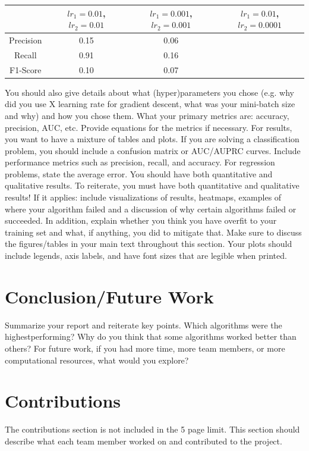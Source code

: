\documentclass{article}
\begin{document}
\begin{tabular}{|c|c|c|c|}
\hline
& $lr_{1}=0.01$, $lr_{2}=0.01$ & $lr_{1}=0.001$, $lr_{2}=0.001$  &   $lr_{1}=0.01$, $lr_{2}=0.0001$ \\
\hline
 Precision    & 0.15        & 0.06  & \\
 Recall       &  0.91       & 0.16  & \\
 F1-Score     & 0.10        & 0.07  & \\
 \hline
\end{tabular}

You should also give details about what (hyper)parameters you chose (e.g. why did you
use X learning rate for gradient descent, what was your mini-batch size and why) and how
you chose them. What your primary metrics are: accuracy, precision,
AUC, etc. Provide equations for the metrics if necessary. For results, you want to have a
mixture of tables and plots. If you are solving a classification problem, you should include a
confusion matrix or AUC/AUPRC curves. Include performance metrics such as precision,
recall, and accuracy. For regression problems, state the average error. You should have
both quantitative and qualitative results. To reiterate, you must have both quantitative
and qualitative results! If it applies: include visualizations of results, heatmaps,
examples of where your algorithm failed and a discussion of why certain algorithms failed
or succeeded. In addition, explain whether you think you have overfit to your training set
and what, if anything, you did to mitigate that. Make sure to discuss the figures/tables in
your main text throughout this section. Your plots should include legends, axis labels, and
have font sizes that are legible when printed.



\section{Conclusion/Future Work }
Summarize your report and reiterate key points. Which algorithms were the highestperforming?
Why do you think that some algorithms worked better than others? For
future work, if you had more time, more team members, or more computational resources,
what would you explore?



\section{Contributions}
The contributions section is not included in the 5 page limit. This section should describe
what each team member worked on and contributed to the project.
\end{document}
